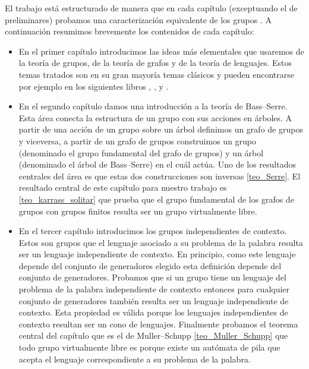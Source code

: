 \documentclass[tesis.tex]{subfiles}
\begin{document}
	El trabajo está estructurado de manera que en cada capítulo (exceptuando el de 
	preliminares) probamos una caracterización equivalente de los grupos \vls.
	A continuación resumimos brevemente los contenidos de cada capítulo:
	\begin{itemize}
		\item 
			En el primer capítulo introducimos las ideas más elementales que usaremos de la teoría de grupos, de la teoría de grafos y de la teoría de lenguajes.
			Estos temas tratados son en su gran mayoría temas clásicos y pueden encontrarse por ejemplo en los siguientes libros \cite{lyndon1977combinatorial}, \cite{diestel2005graph}, \cite{gallier2022mathematical} y \cite{hopcraft-ullman}.
		
		\item 
			En el segundo capítulo damos una introducción a la teoría de Bass--Serre. 
			Esta área conecta la estructura de un grupo con sus acciones en árboles.
			A partir de una acción de un grupo sobre un árbol definimos un grafo de grupos y viceversa, a partir de un grafo de grupos construimos un grupo (denominado el grupo fundamental del grafo de grupos) y un árbol (denominado el árbol de Bass--Serre) en el cuál actúa.
			Uno de los resultados centrales del área es que estas dos construcciones son inversas \ref{teo_Serre}.
			El resultado central de este capítulo para nuestro trabajo es \ref{teo_karrass_solitar} que prueba que el grupo fundamental de los grafos de grupos con grupos finitos resulta ser un grupo virtualmente libre.

		\item 
			En el tercer capítulo introducimos los grupos independientes de contexto.
			Estos son grupos que el lenguaje asociado a su problema de la palabra resulta ser un lenguaje independiente de contexto.
			En principio, como este lenguaje depende del conjunto de generadores elegido esta definición depende del conjunto de generadores.
			Probamos que si un grupo tiene un lenguaje del problema de la palabra independiente de contexto entonces para cualquier conjunto de generadores también resulta ser un lenguaje independiente de contexto.
			Esta propiedad es válida porque los lenguajes independientes de contexto resultan ser un cono de lenguajes.
			Finalmente probamos el teorema central del capítulo que es el de Muller--Schupp \ref{teo_Muller_Schupp} que todo grupo virtualmente libre es \ic porque existe un autómata de pila que acepta el lenguaje correspondiente a su problema de la palabra. 
			
			
		

\end{itemize}
\end{document}

